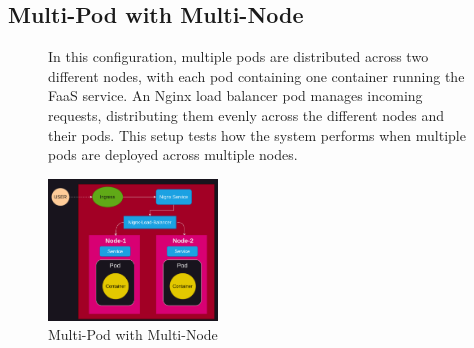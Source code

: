 \documentclass{article}
\begin{document}
\subsection{Multi-Pod with Multi-Node}
\nobreak
\begin{figure}[h]
    \begin{minipage}[b]{0.6\textwidth}
        \flushleft
        In this configuration, multiple pods are distributed across two different
        nodes, with each pod containing one container running the FaaS service. An
        Nginx load balancer pod manages incoming requests, distributing them evenly
        across the different nodes and their pods. This setup tests how the system
        performs when multiple pods are deployed across multiple nodes.
    \end{minipage}%
    \hfill
    \begin{minipage}[b]{0.4\textwidth}
        \centering
        \includegraphics[width=0.4\textwidth]{../images/two_node.png}
        \caption{Multi-Pod with Multi-Node}
        \label{fig:multi_pod_multi_node}
    \end{minipage}
\end{figure}
\end{document}
